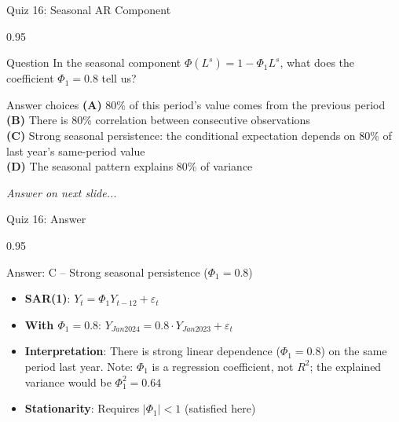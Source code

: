 \documentclass[9pt, aspectratio=169, t]{beamer}
\begin{document}
\begin{frame}{Quiz 16: Seasonal AR Component}
    \begin{cminipage}{0.95\textwidth}
    \begin{alertblock}{Question}
        In the seasonal component $\Phi(L^s) = 1 - \Phi_1 L^s$, what does the coefficient $\Phi_1 = 0.8$ tell us?
    \end{alertblock}

    \vspace{0.4cm}

    \begin{block}{Answer choices}
        \textcolor{MainBlue}{\textbf{(A)}} 80\% of this period's value comes from the previous period\\[3pt]
        \textcolor{MainBlue}{\textbf{(B)}} There is 80\% correlation between consecutive observations\\[3pt]
        \textcolor{MainBlue}{\textbf{(C)}} Strong seasonal persistence: the conditional expectation depends on 80\% of last year's same-period value\\[3pt]
        \textcolor{MainBlue}{\textbf{(D)}} The seasonal pattern explains 80\% of variance
    \end{block}

    \vspace{0.5cm}

    \begin{center}
        \textit{Answer on next slide...}
    \end{center}
    \end{cminipage}
\end{frame}

\begin{frame}{Quiz 16: Answer}
    \begin{cminipage}{0.95\textwidth}
    \begin{exampleblock}{Answer: C -- Strong seasonal persistence ($\Phi_1 = 0.8$)}
        \begin{itemize}
            \item \textbf{SAR(1)}: $Y_t = \Phi_1 Y_{t-12} + \varepsilon_t$
            \item \textbf{With $\Phi_1 = 0.8$}: $Y_{Jan2024} = 0.8 \cdot Y_{Jan2023} + \varepsilon_t$
            \item \textbf{Interpretation}: There is strong linear dependence ($\Phi_1 = 0.8$) on the same period last year. Note: $\Phi_1$ is a regression coefficient, not $R^2$; the explained variance would be $\Phi_1^2 = 0.64$
            \item \textbf{Stationarity}: Requires $|\Phi_1| < 1$ (satisfied here)
        \end{itemize}
    \end{exampleblock}

    \end{cminipage}
\end{frame}
\end{document}
